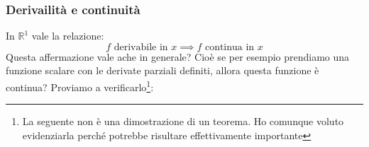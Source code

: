 \subsubsection{Derivailità e continuità}
In $\mathbb{R}^1$ vale la relazione:
\begin{equation*}
	f \text{ derivabile in } x \implies f \text{ continua in } x
\end{equation*}
Questa affermazione vale ache in generale? Cioè se per esempio prendiamo una funzione scalare con le derivate parziali definiti, allora questa funzione è continua? Proviamo a verificarlo\footnote{La seguente non è una dimostrazione di un teorema. Ho comunque voluto evidenziarla perché potrebbe risultare effettivamente importante}:
